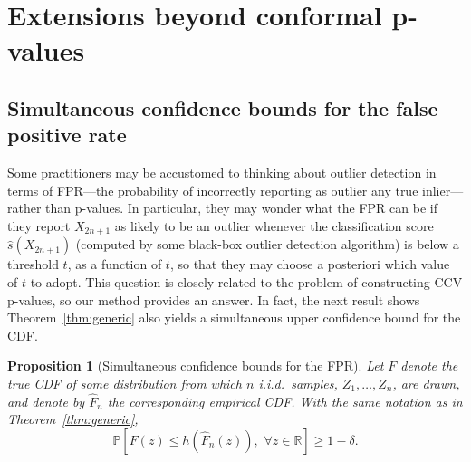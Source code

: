 \documentclass[11pt]{article}
\newtheorem{prop}{Proposition}
\def\R{\mathbb{R}}
\renewcommand{\P}{\mathbb{P}}
\begin{document}


\section{Extensions beyond conformal p-values} \label{sec:extensions}

\subsection{Simultaneous confidence bounds for the false positive rate}

Some practitioners may be accustomed to thinking about outlier detection in terms of FPR---the probability of incorrectly reporting as outlier any true inlier---rather than p-values.
In particular, they may wonder what the FPR can be if they report $X_{2n+1}$ as likely to be an outlier whenever the classification score $\hat{s}(X_{2n+1})$ (computed by some black-box outlier detection algorithm) is below a threshold $t$, as a function of $t$, so that they may choose a posteriori which value of $t$ to adopt.
This question is closely related to the problem of constructing CCV p-values, so our method provides an answer.
In fact, the next result shows Theorem~\ref{thm:generic} also yields a simultaneous upper confidence bound for the CDF. 
\begin{prop}[Simultaneous confidence bounds for the FPR] \label{prop:ucb-fpr}
Let $F$ denote the true CDF of some distribution from which $n$ i.i.d.~samples, $Z_1, \ldots, Z_n$, are drawn, and denote by $\hat{F}_n$ the corresponding empirical CDF.
With the same notation as in Theorem~\ref{thm:generic},
\begin{equation}\label{eq:uniform_CDF}
\P\left[F(z)\le h(\hat{F}_{n}(z)), \,\,\forall z \in \R\right]\ge 1 - \delta.
\end{equation}
\end{prop}
\end{document}
